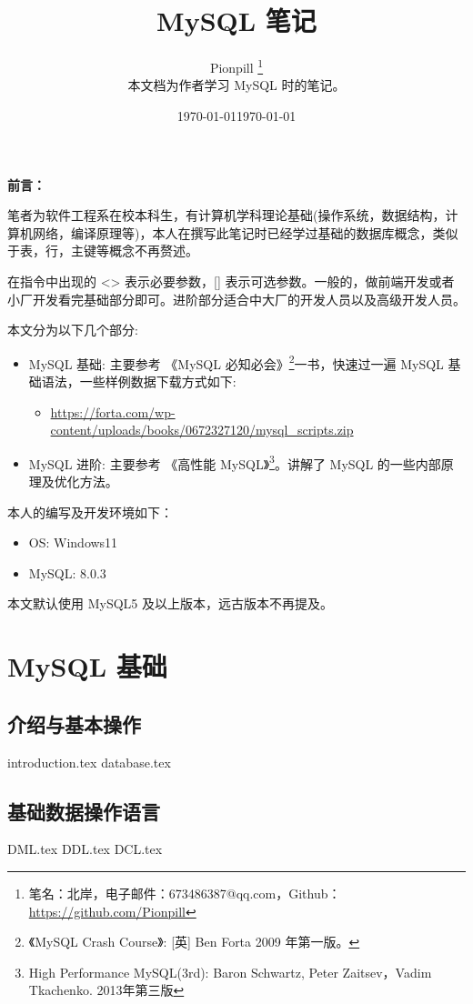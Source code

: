 \documentclass{PionpillNote-book}
\title{MySQL 笔记}
\author{
    Pionpill \footnote{笔名：北岸，电子邮件：673486387@qq.com，Github：\url{https://github.com/Pionpill}} \\
    本文档为作者学习 MySQL 时的笔记。\\
}
\date{\today}
\begin{document}
\pagestyle{plain}
\maketitle

\noindent\textbf{前言：}

笔者为软件工程系在校本科生，有计算机学科理论基础(操作系统，数据结构，计算机网络，编译原理等)，本人在撰写此笔记时已经学过基础的数据库概念，类似于表，行，主键等概念不再赘述。

在指令中出现的 <> 表示必要参数，[] 表示可选参数。一般的，做前端开发或者小厂开发看完基础部分即可。进阶部分适合中大厂的开发人员以及高级开发人员。

本文分为以下几个部分:
\begin{itemize}
    \item MySQL 基础: 主要参考 《MySQL 必知必会》\footnote{《MySQL Crash Course》: [英] Ben Forta 2009 年第一版。}一书，快速过一遍 MySQL 基础语法，一些样例数据下载方式如下:
    \begin{itemize}
        \item \url{https://forta.com/wp-content/uploads/books/0672327120/mysql_scripts.zip}
    \end{itemize}
    \item MySQL 进阶: 主要参考 《高性能 MySQL》\footnote{High Performance MySQL(3rd): Baron Schwartz, Peter Zaitsev，Vadim Tkachenko. 2013年第三版}。讲解了 MySQL 的一些内部原理及优化方法。
\end{itemize}

本人的编写及开发环境如下：
\begin{itemize}
    \item OS: Windows11 
    \item MySQL: 8.0.3
\end{itemize}

本文默认使用 MySQL5 及以上版本，远古版本不再提及。

\date{\today}
\newpage

\tableofcontents

\newpage

\setcounter{page}{1} 
\pagestyle{fancy}

\part{MySQL 基础}
\chapter{介绍与基本操作}
{introduction.tex}
{database.tex}
\chapter{基础数据操作语言}
{DML.tex}
{DDL.tex}
{DCL.tex}
\end{document}

